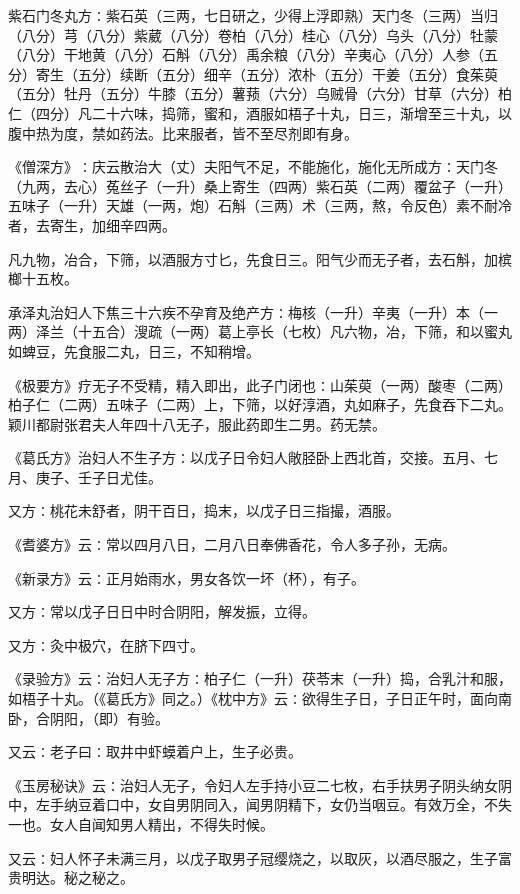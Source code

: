 \documentclass[a4paper,12pt,UTF8,twoside]{ctexbook}
\begin{document}
紫石门冬丸方∶紫石英（三两，七日研之，少得上浮即熟）天门冬（三两）当归（八分）芎（八分）紫葳（八分）卷柏（八分）桂心（八分）乌头（八分）牡蒙（八分）干地黄（八分）石斛（八分）禹余粮（八分）辛夷心（八分）人参（五分）寄生（五分）续断（五分）细辛（五分）浓朴（五分）干姜（五分）食茱萸（五分）牡丹（五分）牛膝（五分）薯蓣（六分）乌贼骨（六分）甘草（六分）柏仁（四分）凡二十六味，捣筛，蜜和，酒服如梧子十丸，日三，渐增至三十丸，以腹中热为度，禁如药法。比来服者，皆不至尽剂即有身。

《僧深方》∶庆云散治大（丈）夫阳气不足，不能施化，施化无所成方∶天门冬（九两，去心）菟丝子（一升）桑上寄生（四两）紫石英（二两）覆盆子（一升）五味子（一升）天雄（一两，炮）石斛（三两）术（三两，熬，令反色）素不耐冷者，去寄生，加细辛四两。

凡九物，冶合，下筛，以酒服方寸匕，先食日三。阳气少而无子者，去石斛，加槟榔十五枚。

承泽丸治妇人下焦三十六疾不孕育及绝产方∶梅核（一升）辛夷（一升）本（一两）泽兰（十五合）溲疏（一两）葛上亭长（七枚）凡六物，冶，下筛，和以蜜丸如蜱豆，先食服二丸，日三，不知稍增。

《极要方》疗无子不受精，精入即出，此子门闭也∶山茱萸（一两）酸枣（二两）柏子仁（二两）五味子（二两）上，下筛，以好淳酒，丸如麻子，先食吞下二丸。颖川都尉张君夫人年四十八无子，服此药即生二男。药无禁。

《葛氏方》治妇人不生子方∶以戊子日令妇人敞胫卧上西北首，交接。五月、七月、庚子、壬子日尤佳。

又方∶桃花未舒者，阴干百日，捣末，以戊子日三指撮，酒服。

《耆婆方》云∶常以四月八日，二月八日奉佛香花，令人多子孙，无病。

《新录方》云∶正月始雨水，男女各饮一坏（杯），有子。

又方∶常以戊子日日中时合阴阳，解发振，立得。

又方∶灸中极穴，在脐下四寸。

《录验方》云∶治妇人无子方∶柏子仁（一升）茯苓末（一升）捣，合乳汁和服，如梧子十丸。（《葛氏方》同之。）《枕中方》云∶欲得生子日，子日正午时，面向南卧，合阴阳，（即）有验。

又云∶老子曰∶取井中虾蟆着户上，生子必贵。

《玉房秘诀》云∶治妇人无子，令妇人左手持小豆二七枚，右手扶男子阴头纳女阴中，左手纳豆着口中，女自男阴同入，闻男阴精下，女仍当咽豆。有效万全，不失一也。女人自闻知男人精出，不得失时候。

又云∶妇人怀子未满三月，以戊子取男子冠缨烧之，以取灰，以酒尽服之，生子富贵明达。秘之秘之。
\end{document}
